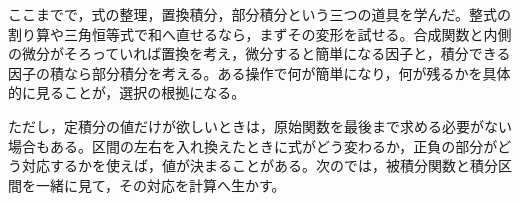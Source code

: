 ここまでで，式の整理，置換積分，部分積分という三つの道具を学んだ。整式の割り算や三角恒等式で和へ直せるなら，まずその変形を試せる。合成関数と内側の微分がそろっていれば置換を考え，微分すると簡単になる因子と，積分できる因子の積なら部分積分を考える。ある操作で何が簡単になり，何が残るかを具体的に見ることが，選択の根拠になる。

ただし，定積分の値だけが欲しいときは，原始関数を最後まで求める必要がない場合もある。区間の左右を入れ換えたときに式がどう変わるか，正負の部分がどう対応するかを使えば，値が決まることがある。次のでは，被積分関数と積分区間を一緒に見て，その対応を計算へ生かす。

